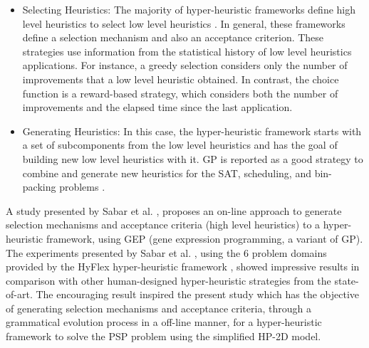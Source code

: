 \documentclass[conference]{IEEEtran}
\begin{document}
\begin{itemize}
	\item Selecting Heuristics: The majority of  hyper-heuristic frameworks define high level heuristics to select low level heuristics \cite{burke2013hyper}. In general, these frameworks define a selection mechanism and also an acceptance criterion. These strategies use information from the statistical history of low level heuristics applications. For instance, a greedy selection considers only the number of improvements that a low level heuristic obtained. In contrast, the choice function \cite{burke2013hyper} is a reward-based strategy, which considers both the number of improvements and the elapsed time since the last application.
	
	
	
	
	
	
	
	
	
%	
	

	\item Generating Heuristics: In this case, the hyper-heuristic framework starts with a set of subcomponents  from the low level heuristics and has the goal of building new low level heuristics with it. GP is reported as a good strategy to combine and generate new heuristics for the SAT, scheduling, and bin-packing problems \cite{sabar2015automatic}.
\end{itemize}


A study presented by Sabar et al. \cite{sabar2015automatic}, proposes an on-line approach to generate selection mechanisms and acceptance criteria (high level heuristics) to a hyper-heuristic framework, using GEP \cite{ferreira2008gene} (gene expression programming, a variant of GP). The experiments presented by Sabar et al. \cite{sabar2015automatic}, using the 6 problem domains provided by the HyFlex hyper-heuristic framework \cite{ochoa2012hyflex}, showed impressive   results in  comparison  with other human-designed hyper-heuristic strategies from the state-of-art. The encouraging result inspired the present study which has the objective of
 generating selection mechanisms and acceptance criteria, through a grammatical evolution process in a off-line manner, for a hyper-heuristic framework to solve the PSP problem using the simplified HP-2D model.
\end{document}
